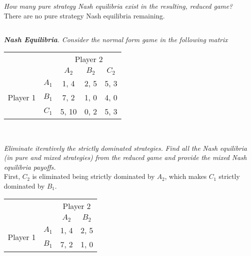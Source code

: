 \documentclass[12pt]{amsart}
\begin{document}
 
	\subsubsection{}
	\textit{How many pure strategy Nash equilibria exist in the resulting, reduced game?} \\

	There are no pure strategy Nash equilibria remaining.


\subsection{}
\textit{\textbf{Nash Equilibria}. Consider the normal form game in the following matrix}

\begin{center}
	\def\arraystretch{1.25}%
	\begin{tabular}{ccccc}
		&                            & \multicolumn{3}{c}{Player 2}                                                         \\
		& \multicolumn{1}{c|}{}      & \multicolumn{1}{c|}{$A_2$} & \multicolumn{1}{c|}{$B_2$} & \multicolumn{1}{c|}{$C_2$} \\ \cline{2-5} 
		& \multicolumn{1}{c|}{$A_1$} & \multicolumn{1}{c|}{1, 4}  & \multicolumn{1}{c|}{2, 5}  & \multicolumn{1}{c|}{5, 3}  \\ \cline{2-5} 
		Player 1 & \multicolumn{1}{c|}{$B_1$} & \multicolumn{1}{c|}{7, 2}  & \multicolumn{1}{c|}{1, 0}  & \multicolumn{1}{c|}{4, 0}  \\ \cline{2-5} 
		& \multicolumn{1}{c|}{$C_1$} & \multicolumn{1}{c|}{5, 10} & \multicolumn{1}{c|}{0, 2}  & \multicolumn{1}{c|}{5, 3}  \\ \cline{2-5} 
	\end{tabular} \\[2ex]
\end{center}

\textit{Eliminate iteratively the strictly dominated strategies. Find all the Nash equilibria (in pure
	and mixed strategies) from the reduced game and provide the mixed Nash equilibria
	payoffs.} \\
	
	First, $C_2$ is eliminated being strictly dominated by $A_2$,
	which makes $C_1$ strictly dominated by $B_1$.

	\begin{center}
		\def\arraystretch{1.25}%
		\begin{tabular}{cccc}
			&                            & \multicolumn{2}{c}{Player 2}                            \\
			& \multicolumn{1}{c|}{}      & \multicolumn{1}{c|}{$A_2$} & \multicolumn{1}{c|}{$B_2$} \\ \cline{2-4} 
			\multirow{2}{*}{Player 1} & \multicolumn{1}{c|}{$A_1$} & \multicolumn{1}{c|}{1, 4}  & \multicolumn{1}{c|}{2, 5}  \\ \cline{2-4} 
			& \multicolumn{1}{c|}{$B_1$} & \multicolumn{1}{c|}{7, 2}  & \multicolumn{1}{c|}{1, 0}  \\ \cline{2-4} 
		\end{tabular} \\[1ex]
	\end{center}
	
\end{document}
